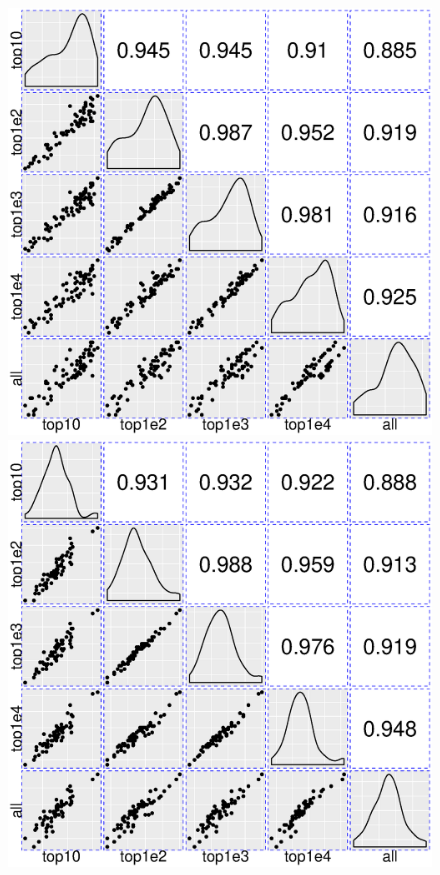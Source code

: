 \documentclass[11pt, a4paper]{article}
\begin{document}
\begin{figure}[h!]
\begin{center}
\includegraphics[scale=0.38]{Figures/norm1.eps}
\includegraphics[scale=0.38]{Figures/norm2.eps}

\end{center}
\end{figure}
\end{document}

